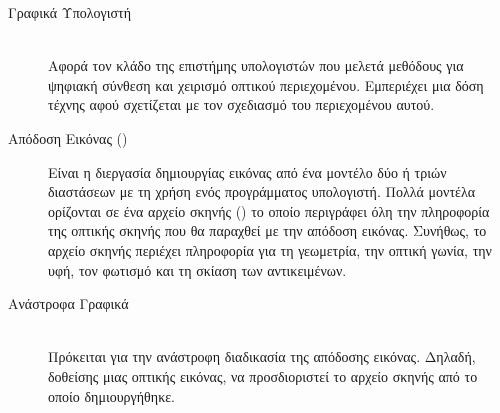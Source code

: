 \begin{description}
    \item[Γραφικά Υπολογιστή] \hfill \\ Αφορά τον κλάδο της επιστήμης υπολογιστών που μελετά μεθόδους για ψηφιακή σύνθεση και χειρισμό οπτικού περιεχομένου. Εμπεριέχει μια δόση τέχνης αφού σχετίζεται με τον σχεδιασμό του περιεχομένου αυτού.
    
    \item[Απόδοση Εικόνας ()] Είναι η διεργασία δημιουργίας εικόνας από ένα μοντέλο δύο ή τριών διαστάσεων με τη χρήση ενός προγράμματος υπολογιστή. Πολλά μοντέλα ορίζονται σε ένα αρχείο σκηνής () το οποίο περιγράφει όλη την πληροφορία της οπτικής σκηνής που θα παραχθεί με την απόδοση εικόνας. Συνήθως, το αρχείο σκηνής περιέχει πληροφορία για τη γεωμετρία, την οπτική γωνία, την υφή, τον φωτισμό και τη σκίαση των αντικειμένων.
    
    \item[Ανάστροφα Γραφικά] \hfill \\ Πρόκειται για την ανάστροφη διαδικασία της απόδοσης εικόνας. Δηλαδή, δοθείσης μιας οπτικής εικόνας, να προσδιοριστεί το αρχείο σκηνής από το οποίο δημιουργήθηκε.
    

\end{description}
